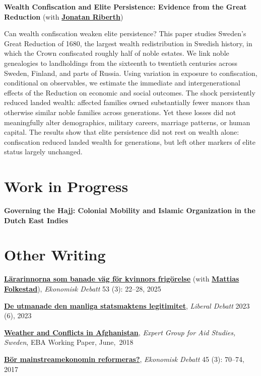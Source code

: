 \documentclass[a4paper]{article}
\newcommand{\paperentry}[3]{%
  \noindent\textbf{#1} #2\par
  \smallskip
  {#3\par}
  \medskip
}
\newcommand{\paperentrynoabstract}[1]{%
  \noindent\textbf{#1}\par
  \medskip
}
\begin{document}
\newpage

\paperentry
{Wealth Confiscation and Elite Persistence: Evidence from the Great Reduction}
{(with \href{https://www.jonatanriberth.com/}{\textbf{Jonatan \mbox{Riberth}}})}
{Can wealth confiscation weaken elite persistence? This paper studies Sweden's Great Reduction of 1680, the largest wealth redistribution in Swedish history, in which the Crown confiscated roughly half of noble estates. We link noble genealogies to landholdings from the sixteenth to twentieth centuries across Sweden, Finland, and parts of Russia. Using variation in exposure to confiscation, conditional on observables, we estimate the immediate and intergenerational effects of the Reduction on economic and social outcomes. The shock persistently reduced landed wealth: affected families owned substantially fewer manors than otherwise similar noble families across generations. Yet these losses did not meaningfully alter demographics, military careers, marriage patterns, or human capital. The results show that elite persistence did not rest on wealth alone: confiscation reduced landed wealth for generations, but left other markers of elite status largely unchanged.}

\section*{Work in Progress}

\paperentrynoabstract
{Governing the Hajj: Colonial Mobility and Islamic Organization in the Dutch East Indies}

\section*{Other Writing}

\textbf{\href{https://www.monirbounadi.com/assets/publications/bounadi2025.pdf}{L\"{a}rarinnorna som banade v\"{a}g f\"{o}r kvinnors frig\"{o}relse}} (with \href{https://mattiasfolkestad.com/}{\textbf{Mattias Folkestad}}), \textit{Ekonomisk Debatt} 53 (3): 22--28, 2025\par
\smallskip
\textbf{\href{https://www.liberaldebatt.se/2023/12/de-utmanade-den-manliga-statsmaktens-legitimitet/}{De utmanade den manliga statsmaktens legitimitet}}, \textit{Liberal Debatt} 2023 (6), 2023\par
\smallskip
\textbf{\href{https://www.monirbounadi.com/assets/publications/bounadi2018.pdf}{Weather and Conflicts in Afghanistan}}, \textit{Expert Group for Aid Studies, Sweden}, EBA Working Paper, June,~2018\par
\smallskip
\textbf{\href{https://www.monirbounadi.com/assets/publications/bounadi2017.pdf}{B\"{o}r mainstreamekonomin reformeras?}}, \textit{Ekonomisk Debatt} 45 (3): 70--74, 2017\par
\end{document}
